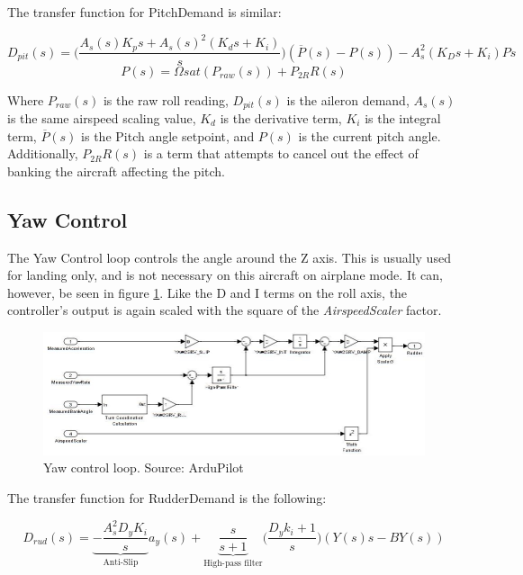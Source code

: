 The transfer function for PitchDemand is similar:

\begin{equation}
D_{pit}(s) = \bigg(\frac{A_s(s) K_p s + A_s(s)^2(K_d s + K_i)}{s}\bigg)(\overline{P}(s) - P(s)) - A_s^2(K_D s + K_i)Ps
\end{equation}
\begin{equation}
P(s) = \Omega sat(P_{raw}(s)) + P_{2R}R(s)
\end{equation}

Where $P_{raw}(s)$ is the raw roll reading, $D_{pit}(s)$ is the aileron demand, $A_s(s)$ is the same airspeed scaling value, $K_d$ is the derivative term, $K_i$ is the integral term, $\overline{P}(s)$ is the Pitch angle setpoint, and $P(s)$ is the current pitch angle. Additionally, $P_{2R}R(s)$ is a term that attempts to cancel out the effect of banking the aircraft affecting the pitch.



\subsection{Yaw Control}
The Yaw Control loop controls the angle around the Z axis. This is usually used for landing only, and is not necessary on this aircraft on airplane mode. It can, however, be seen in figure \ref{fig:yaw_loop}.
Like the D and I terms on the roll axis, the controller's output is again scaled with the square of the \textit{AirspeedScaler} factor.

\begin{figure}[H]
\centering
  \includegraphics[width=\linewidth]{figs/yaw_control_loop.jpg}
  \caption{Yaw control loop. Source: ArduPilot}
  \label{fig:yaw_loop}
\end{figure}

The transfer function for RudderDemand is the following:

\begin{equation}
D_{rud}(s) = \underbrace{ - \frac{A_s^2 D_y K_i}{s}}_\text{Anti-Slip} a_y(s) + \underbrace{\frac{s}{s+1}}_\text{High-pass filter}\bigg(\frac{D_y k_i + 1}{s}\bigg)(Y(s)s-BY(s))
\end{equation}

